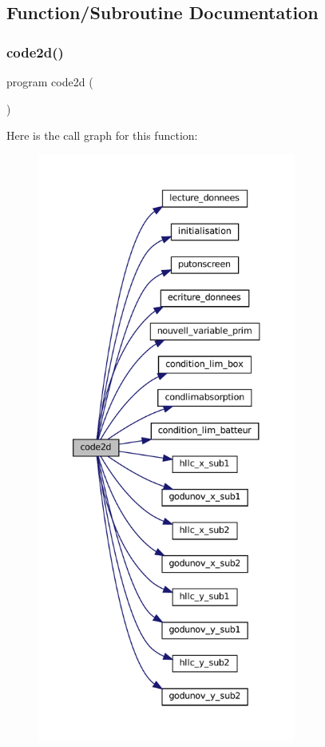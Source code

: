 \subsection{Function/\+Subroutine Documentation}
\mbox{\label{main2Dv1_8f90_a8712173bc20143ca5b1b8cbd782b563e}} 
\subsubsection{\texorpdfstring{code2d()}{code2d()}}
{\footnotesize\ttfamily program code2d (\begin{DoxyParamCaption}{ }\end{DoxyParamCaption})}

Here is the call graph for this function\+:
\nopagebreak
\begin{figure}[H]
\begin{center}
\leavevmode
\includegraphics[height=550pt]{main2Dv1_8f90_a8712173bc20143ca5b1b8cbd782b563e_cgraph}
\end{center}
\end{figure}
\mbox{\label{main2Dv1_8f90_ae64974281df2d6f2222187665fd79e38}} 
